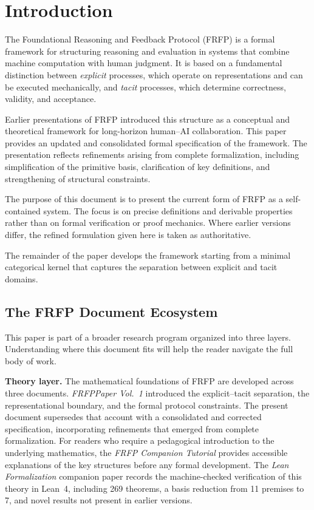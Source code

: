 \section{Introduction}
\label{ch:intro}

The Foundational Reasoning and Feedback Protocol (FRFP) is a formal framework for structuring
reasoning and evaluation in systems that combine machine computation with human judgment. It
is based on a fundamental distinction between \emph{explicit} processes, which operate on
representations and can be executed mechanically, and \emph{tacit} processes, which determine
correctness, validity, and acceptance.

Earlier presentations of FRFP introduced this structure as a conceptual and theoretical framework
for long-horizon human--AI collaboration. This paper provides an updated and consolidated formal
specification of the framework. The presentation reflects refinements arising from complete
formalization, including simplification of the primitive basis, clarification of key definitions,
and strengthening of structural constraints.

The purpose of this document is to present the current form of FRFP as a self-contained system.
The focus is on precise definitions and derivable properties rather than on formal verification or proof
mechanics. Where earlier versions differ, the refined formulation given here is taken as authoritative.

The remainder of the paper develops the framework starting from a minimal categorical kernel
that captures the separation between explicit and tacit domains.

\subsection*{The FRFP Document Ecosystem}

This paper is part of a broader research program organized into three layers. Understanding
where this document fits will help the reader navigate the full body of work.

\textbf{Theory layer.} The mathematical foundations of FRFP are developed across three documents.
\textit{FRFPPaper Vol.~1} introduced the explicit--tacit separation, the representational boundary,
and the formal protocol constraints. The present document supersedes that account with a
consolidated and corrected specification, incorporating refinements that emerged from complete
formalization. For readers who require a pedagogical introduction to the underlying mathematics,
the \textit{FRFP Companion Tutorial} provides accessible explanations of the key structures
before any formal development. The \textit{Lean Formalization} companion paper records the
machine-checked verification of this theory in Lean~4, including 269 theorems, a basis reduction
from 11 premises to 7, and novel results not present in earlier versions.


